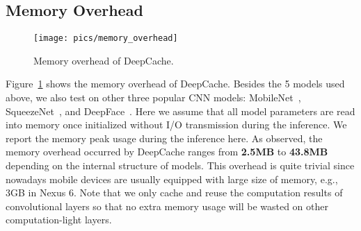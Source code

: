 \documentclass[10pt,acmtog]{acmart}
\newcommand{\framework}{DeepCache\xspace}
\begin{document}
\subsection{Memory Overhead}\begin{figure}[t]
	\centering
	\texttt{[image: pics/memory\_overhead]}
	\caption{Memory overhead of \framework.}
	\label{fig:memory_overhead}
\end{figure}

Figure~\ref{fig:memory_overhead} shows the memory overhead of \framework.
Besides the 5 models used above, we also test on other three popular CNN models: MobileNet~\cite{MobileNet}, SqueezeNet~\cite{squeezenet}, and DeepFace~\cite{DeepFace}.
Here we assume that all model parameters are read into memory once initialized without I/O transmission during the inference.
We report the memory peak usage during the inference here.
As observed, the memory overhead occurred by \framework ranges from \textbf{2.5MB} to \textbf{43.8MB} depending on the internal structure of models.
This overhead is quite trivial since nowadays mobile devices are usually equipped with large size of memory, e.g., 3GB in Nexus 6.
Note that we only cache and reuse the computation results of convolutional layers so that no extra memory usage will be wasted on other computation-light layers.
\end{document}
